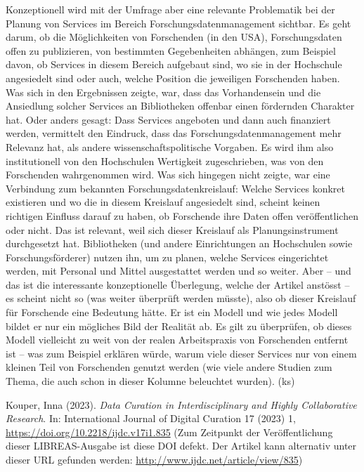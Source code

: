 \documentclass[a4paper,
fontsize=11pt,
oneside,
numbers=noperiodatend,
parskip=half-,
bibliography=totoc,
final
]{scrartcl}
\begin{document}
Konzeptionell wird mit der Umfrage aber eine relevante Problematik bei
der Planung von Services im Bereich Forschungsdatenmanagement sichtbar.
Es geht darum, ob die Möglichkeiten von Forschenden (in den USA),
Forschungsdaten offen zu publizieren, von bestimmten Gegebenheiten
abhängen, zum Beispiel davon, ob Services in diesem Bereich aufgebaut
sind, wo sie in der Hochschule angesiedelt sind oder auch, welche
Position die jeweiligen Forschenden haben. Was sich in den Ergebnissen
zeigte, war, dass das Vorhandensein und die Ansiedlung solcher Services
an Bibliotheken offenbar einen fördernden Charakter hat. Oder anders
gesagt: Dass Services angeboten und dann auch finanziert werden,
vermittelt den Eindruck, dass das Forschungsdatenmanagement mehr
Relevanz hat, als andere wissenschaftspolitische Vorgaben. Es wird ihm
also institutionell von den Hochschulen Wertigkeit zugeschrieben, was
von den Forschenden wahrgenommen wird. Was sich hingegen nicht zeigte,
war eine Verbindung zum bekannten Forschungsdatenkreislauf: Welche
Services konkret existieren und wo die in diesem Kreislauf angesiedelt
sind, scheint keinen richtigen Einfluss darauf zu haben, ob Forschende
ihre Daten offen veröffentlichen oder nicht. Das ist relevant, weil sich
dieser Kreislauf als Planungsinstrument durchgesetzt hat. Bibliotheken
(und andere Einrichtungen an Hochschulen sowie Forschungsförderer)
nutzen ihn, um zu planen, welche Services eingerichtet werden, mit
Personal und Mittel ausgestattet werden und so weiter. Aber -- und das
ist die interessante konzeptionelle Überlegung, welche der Artikel
anstösst -- es scheint nicht so (was weiter überprüft werden müsste),
also ob dieser Kreislauf für Forschende eine Bedeutung hätte. Er ist ein
Modell und wie jedes Modell bildet er nur ein mögliches Bild der
Realität ab. Es gilt zu überprüfen, ob dieses Modell vielleicht zu weit
von der realen Arbeitspraxis von Forschenden entfernt ist -- was zum
Beispiel erklären würde, warum viele dieser Services nur von einem
kleinen Teil von Forschenden genutzt werden (wie viele andere Studien
zum Thema, die auch schon in dieser Kolumne beleuchtet wurden). (ks)

Kouper, Inna (2023). \emph{Data Curation in Interdisciplinary and Highly
Collaborative Research}. In: International Journal of Digital Curation
17 (2023) 1, \url{https://doi.org/10.2218/ijdc.v17i1.835} (Zum Zeitpunkt
der Veröffentlichung dieser LIBREAS-Ausgabe ist diese DOI defekt. Der
Artikel kann alternativ unter dieser URL gefunden werden:
\url{http://www.ijdc.net/article/view/835})
\end{document}
